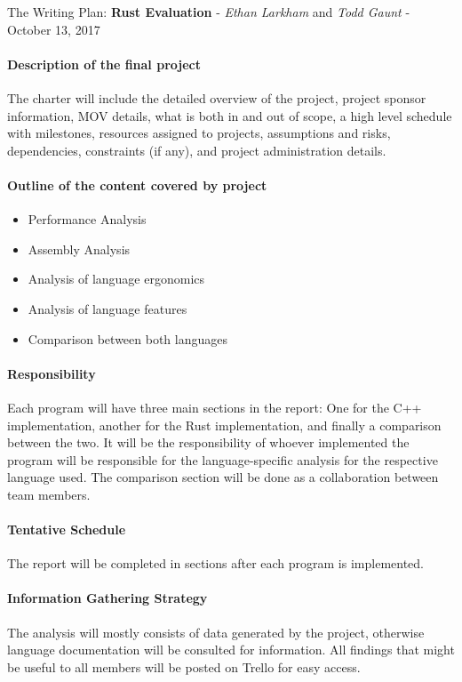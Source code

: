 \documentclass[10pt,a4paper]{report}
\begin{document}
\begin{center}
	{\Large The Writing Plan: {\bfseries Rust Evaluation}}
	- {\large{\itshape Ethan Larkham} and {\itshape Todd Gaunt}}
	- {\large October 13, 2017}
\end{center}
\vspace{0.5em}
\paragraph{Description of the final project}
The charter will include the detailed overview of the project, project sponsor
information, MOV details, what is both in and out of scope, a high level
schedule with milestones, resources assigned to projects, assumptions and
risks, dependencies, constraints (if any), and project administration details.
\paragraph{Outline of the content covered by project}
\begin{flushleft}
	\begin{itemize}
		\item Performance Analysis
		\item Assembly Analysis
		\item Analysis of language ergonomics
		\item Analysis of language features
		\item Comparison between both languages
	\end{itemize}
\end{flushleft}
\paragraph{Responsibility}
Each program will have three main sections in the report: One for the C++
implementation, another for the Rust implementation, and finally a comparison
between the two. It will be the responsibility of whoever implemented the
program will be responsible for the language-specific analysis for the
respective language used. The comparison section will be done as a
collaboration between team members.
\paragraph{Tentative Schedule}
The report will be completed in sections after each program is implemented.
\paragraph{Information Gathering Strategy}
The analysis will mostly consists of data generated by the project, otherwise
language documentation will be consulted for information. All findings that
might be useful to all members will be posted on Trello for easy access.
\end{document}
